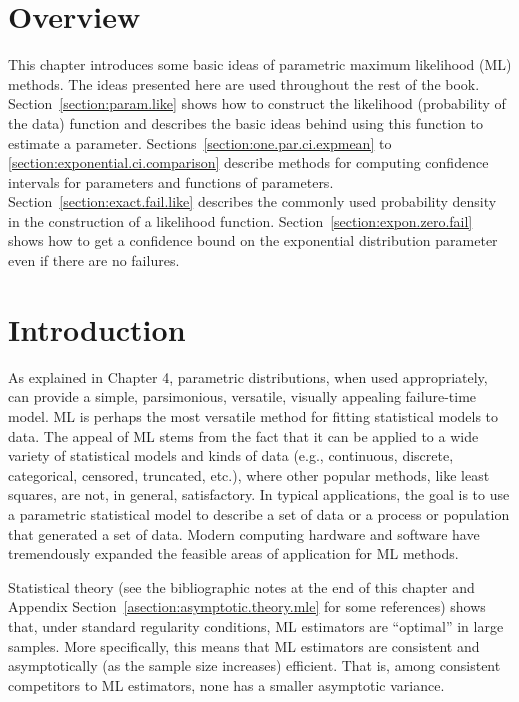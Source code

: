 \section*{Overview}
This chapter introduces some basic ideas of parametric maximum
likelihood (ML) methods.  The ideas presented here are used
throughout the rest of the book.  Section~\ref{section:param.like}
shows how to construct the likelihood (probability of the data)
function and describes the basic ideas behind using this function to
estimate a parameter.  Sections~\ref{section:one.par.ci.expmean} to
\ref{section:exponential.ci.comparison} describe methods for computing
confidence intervals for parameters and functions of parameters.
Section~\ref{section:exact.fail.like} describes the commonly used
probability density in the construction of a likelihood function.
Section~\ref{section:expon.zero.fail} shows how to get a confidence
bound on the exponential distribution parameter even if there are no
failures.

\section{Introduction}
\label{section:ml.intro}
As explained in Chapter 4, parametric distributions, when used 
appropriately, can provide a simple, parsimonious, versatile, visually
appealing failure-time model.
ML is perhaps the most versatile method for
fitting statistical models to data.  The appeal of ML stems from the
fact that it can be applied to a wide variety of statistical models
and kinds of data (e.g., continuous, discrete, categorical, censored,
truncated, etc.), where other popular methods, like least squares, are 
not, in general, satisfactory. In
typical applications, the goal is to use a parametric statistical
model to describe a set of data or a process or population that
generated a set of data. Modern computing hardware and software have
tremendously expanded the feasible areas of application for ML
methods.

Statistical theory (see the bibliographic notes at the end of this
chapter and Appendix Section~\ref{asection:asymptotic.theory.mle}
for some references) shows that, under standard regularity
conditions, ML estimators are ``optimal'' in large samples. More
specifically, this means that
ML estimators are consistent and asymptotically (as the
sample size increases) efficient. That is, among consistent
competitors to ML estimators, none has a smaller asymptotic variance.

